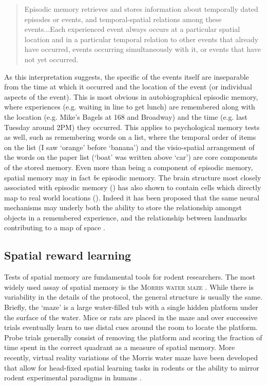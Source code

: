 \begin{quote}
Episodic memory retrieves and stores information about temporally dated episodes or events, and temporal-spatial relations among these events...Each experienced event always occurs at a particular spatial location and in a particular temporal relation to other events that already have occurred, events occurring simultaneously with it, or events that have not yet occurred.
\end{quote}

As this interpretation suggests, the specific of the events itself are inseparable from the time at which it occurred and the location of the event (or individual aspects of the event).
This is most obvious in autobiographical episodic memory, where experiences (e.g. waiting in line to get lunch) are remembered along with the location (e.g. Mike's Bagels at 168 and Broadway) and the time (e.g. last Tuesday around 2PM) they occurred.
This applies to psychological memory tests as well, such as remembering words on a list, where the temporal order of items on the list (I saw `orange' before `banana') and the visio-spatial arrangement of the words on the paper list (`boat' was written above `car') are core components of the stored memory.
Even more than being a component of episodic memory, spatial memory may in fact \emph{be} episodic memory.
The brain structure most closely associated with episodic memory () has also shown to contain cells which directly map to real world locations ().
Indeed it has been proposed that the same neural mechanisms may underly both the ability to store the relationship amongst objects in a remembered experience, and the relationship between landmarks contributing to a map of space \citep{Buzsaki2013}.

\subsection{Spatial reward learning}\label{sec:intro:memory:spatial-reward}
Tests of spatial memory are fundamental tools for rodent researchers.
The most widely used assay of spatial memory is the \textsc{Morris water maze} \citep{Morris1984}.
While there is variability in the details of the protocol, the general structure is usually the same.
Briefly, the `maze' is a large water-filled tub with a single hidden platform under the surface of the water.
Mice or rats are placed in the maze and over successive trials eventually learn to use distal cues around the room to locate the platform.
Probe trials generally consist of removing the platform and scoring the fraction of time spent in the correct quadrant as a measure of spatial memory.
More recently, virtual reality variations of the Morris water maze have been developed that allow for head-fixed spatial learning tasks in rodents \citep{Aronov2014} or the ability to mirror rodent experimental paradigms in humans \citep{}.

